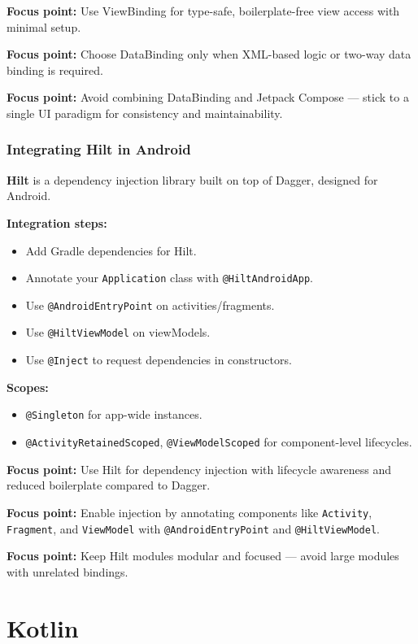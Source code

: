 \documentclass[a4paper,12pt]{article}
\begin{document}
\textbf{Focus point:} Use ViewBinding for type-safe, boilerplate-free view access with minimal setup.

\textbf{Focus point:} Choose DataBinding only when XML-based logic or two-way data binding is required.

\textbf{Focus point:} Avoid combining DataBinding and Jetpack Compose — stick to a single UI paradigm for consistency and maintainability.

\subsubsection{Integrating Hilt in Android}

\textbf{Hilt} is a dependency injection library built on top of Dagger, designed for Android.

\textbf{Integration steps:}
\begin{itemize}
  \item Add Gradle dependencies for Hilt.
  \item Annotate your \texttt{Application} class with \texttt{@HiltAndroidApp}.
  \item Use \texttt{@AndroidEntryPoint} on activities/fragments.
  \item Use \texttt{@HiltViewModel} on viewModels.
  \item Use \texttt{@Inject} to request dependencies in constructors.
\end{itemize}

\textbf{Scopes:}
\begin{itemize}
  \item \texttt{@Singleton} for app-wide instances.
  \item \texttt{@ActivityRetainedScoped}, \texttt{@ViewModelScoped} for component-level lifecycles.
\end{itemize}

\textbf{Focus point:} Use Hilt for dependency injection with lifecycle awareness and reduced boilerplate compared to Dagger.

\textbf{Focus point:} Enable injection by annotating components like \texttt{Activity}, \texttt{Fragment}, and \texttt{ViewModel} with \texttt{@AndroidEntryPoint} and \texttt{@HiltViewModel}.

\textbf{Focus point:} Keep Hilt modules modular and focused — avoid large modules with unrelated bindings.


\section{Kotlin}
\end{document}
